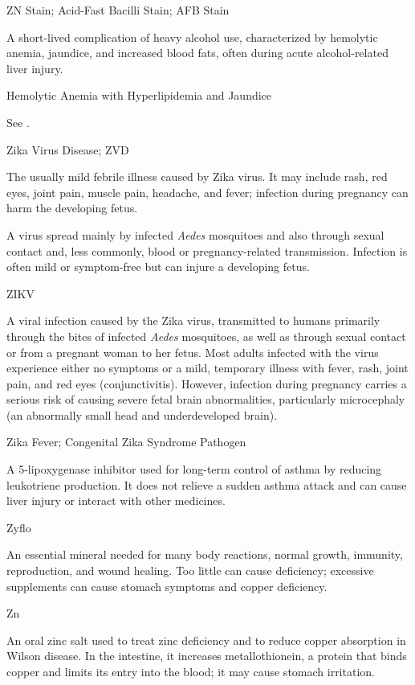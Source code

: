 \synonyms
ZN Stain; Acid-Fast Bacilli Stain; AFB Stain

 A short-lived complication of heavy alcohol use, characterized by hemolytic anemia, jaundice, and increased blood fats, often during acute alcohol-related liver injury.

\synonyms
Hemolytic Anemia with Hyperlipidemia and Jaundice

 See .

\synonyms
Zika Virus Disease; ZVD

 The usually mild febrile illness caused by Zika virus. It may include rash, red eyes, joint pain, muscle pain, headache, and fever; infection during pregnancy can harm the developing fetus.

 A virus spread mainly by infected \textit{Aedes} mosquitoes and also through sexual contact and, less commonly, blood or pregnancy-related transmission. Infection is often mild or symptom-free but can injure a developing fetus.

\synonyms
ZIKV

 A viral infection caused by the Zika virus, transmitted to humans primarily through the bites of infected \textit{Aedes} mosquitoes, as well as through sexual contact or from a pregnant woman to her fetus. Most adults infected with the virus experience either no symptoms or a mild, temporary illness with fever, rash, joint pain, and red eyes (conjunctivitis). However, infection during pregnancy carries a serious risk of causing severe fetal brain abnormalities, particularly microcephaly (an abnormally small head and underdeveloped brain).

\synonyms
Zika Fever; Congenital Zika Syndrome Pathogen

 A 5-lipoxygenase inhibitor used for long-term control of asthma by reducing leukotriene production. It does not relieve a sudden asthma attack and can cause liver injury or interact with other medicines.

\synonyms
Zyflo

 An essential mineral needed for many body reactions, normal growth, immunity, reproduction, and wound healing. Too little can cause deficiency; excessive supplements can cause stomach symptoms and copper deficiency.

\synonyms
Zn

 An oral zinc salt used to treat zinc deficiency and to reduce copper absorption in Wilson disease. In the intestine, it increases metallothionein, a protein that binds copper and limits its entry into the blood; it may cause stomach irritation.

